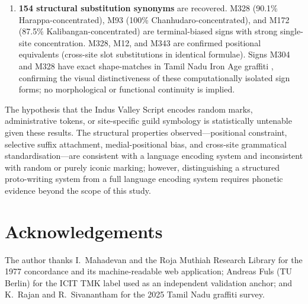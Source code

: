 \documentclass[12pt,letterpaper]{article}
\begin{document}
\begin{enumerate}
          is inferred.
    \item \textbf{154 structural substitution synonyms} are recovered.
          M328 (90.1\% Harappa-concentrated), M93 (100\%
          Chanhudaro-concentrated), and M172 (87.5\%
          Kalibangan-concentrated) are terminal-biased signs with
          strong single-site concentration.
          M328, M12, and M343 are confirmed positional equivalents
          (cross-site slot substitutions in identical formulae).
          Signs M304 and M328 have exact shape-matches in Tamil Nadu
          Iron Age graffiti \citep{Rajan2025}, confirming the visual
          distinctiveness of these computationally isolated sign forms;
          no morphological or functional continuity is implied.
\end{enumerate}

The hypothesis that the Indus Valley Script encodes random marks,
administrative tokens, or site-specific guild symbology is statistically
untenable given these results.
The structural properties observed---positional constraint, selective
suffix attachment, medial-positional bias, and cross-site grammatical
standardisation---are consistent with a language encoding system and
inconsistent with random or purely iconic marking; however,
distinguishing a structured proto-writing system from a full language
encoding system requires phonetic evidence beyond the scope of this
study.

\section*{Acknowledgements}

The author thanks I.\ Mahadevan and the Roja Muthiah Research Library
for the 1977 concordance and its machine-readable web application;
Andreas Fuls (TU Berlin) for the ICIT TMK label used as an independent
validation anchor; and K.\ Rajan and R.\ Sivanantham for the 2025
Tamil Nadu graffiti survey.



\end{document}
